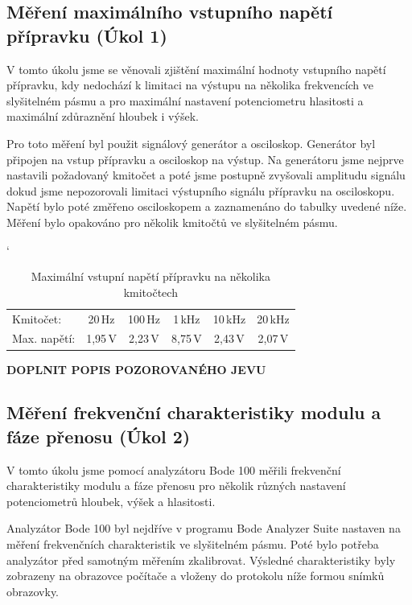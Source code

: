 \documentclass[a4paper, czech]{article}
\begin{document}
\subsection{Měření maximálního vstupního napětí přípravku (Úkol 1)}

V tomto úkolu jsme se věnovali zjištění maximální hodnoty vstupního napětí přípravku,
kdy nedochází k limitaci na výstupu na několika frekvencích ve slyšitelném pásmu
a pro maximální nastavení potenciometru hlasitosti a maximální zdůraznění hloubek i výšek.

Pro toto měření byl použit signálový generátor a osciloskop.
Generátor byl připojen na vstup přípravku a osciloskop na výstup.
Na generátoru jsme nejprve nastavili požadovaný kmitočet a poté jsme postupně zvyšovali
amplitudu signálu dokud jsme nepozorovali limitaci výstupního signálu přípravku na osciloskopu.
Napětí bylo poté změřeno osciloskopem a zaznamenáno do tabulky uvedené níže.
Měření bylo opakováno pro několik kmitočtů ve slyšitelném pásmu.

\begin{table}[H]
    \catcode`
    \centering
    \caption{Maximální vstupní napětí přípravku na několika kmitočtech}
    \begin{tabular}{lccccc}
        \toprule
        Kmitočet:    & 20\,Hz  & 100\,Hz & 1\,kHz  & 10\,kHz & 20\,kHz \\
        \cmidrule(rl){1-6}
        Max. napětí: & 1,95\,V & 2,23\,V & 8,75\,V & 2,43\,V & 2,07\,V \\
        \bottomrule
    \end{tabular}
\end{table}

\textbf{DOPLNIT POPIS POZOROVANÉHO JEVU}

\subsection{Měření frekvenční charakteristiky modulu a fáze přenosu (Úkol 2)}

V tomto úkolu jsme pomocí analyzátoru Bode 100 měřili frekvenční charakteristiky
modulu a fáze přenosu pro několik různých nastavení potenciometrů hloubek, výšek a hlasitosti.

Analyzátor Bode 100 byl nejdříve v programu Bode Analyzer Suite nastaven na měření
frekvenčních charakteristik ve slyšitelném pásmu.
Poté bylo potřeba analyzátor před samotným měřením zkalibrovat.
Výsledné charakteristiky byly zobrazeny na obrazovce počítače a vloženy do protokolu
níže formou snímků obrazovky.
\end{document}
